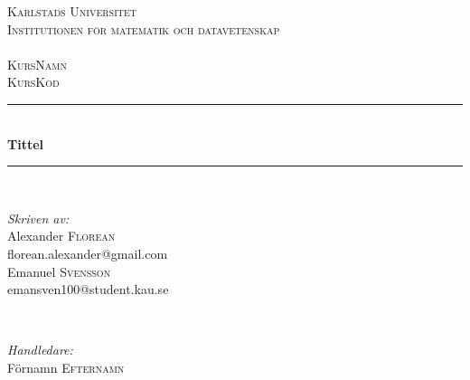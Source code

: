 \begin{titlepage}

\newcommand{\HRule}{\rule{\linewidth}{0.5mm}} %

\center %
 

 \textsc{\LARGE{Karlstads Universitet}\\ \small Institutionen för matematik och datavetenskap}\\
 \textsc{\Large \\KursNamn \\ \small KursKod}\\ %



 \HRule \\[0.3cm]
 { \huge \bfseries Tittel}\\[0.3cm] %
 \HRule \\[1.5cm]
  

  \begin{minipage}{0.4\textwidth}
  \begin{flushleft} \large
  \emph{Skriven av:}\\
  Alexander \textsc{Florean}\\
  florean.alexander@gmail.com\\ 
  Emanuel \textsc{Svensson}\\
  emansven100@student.kau.se\\
  \end{flushleft}
  \end{minipage}
  ~
  \begin{minipage}{0.4\textwidth}
  \begin{flushright} \large
  \emph{Handledare:}\\
  Förnamn \textsc{Efternamn} %
  

\end{flushright}
\end{minipage}
\end{titlepage}
